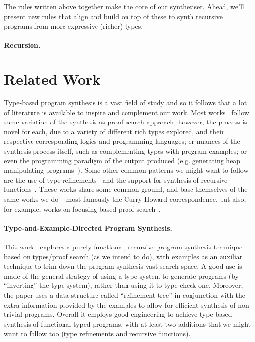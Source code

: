 \documentclass{llncs}
\newcommand{\mypara}[1]{\paragraph{\textbf{#1}.}}
\begin{document}

The rules written above together make the core of our synthetiser. Ahead, we'll
present new rules that align and build on top of these to synth recursive
programs from more expressive (richer) types.

\mypara{Recursion}

\section{Related Work}

Type-based program synthesis is a vast field of study and so it
follows that a lot of literature is available to inspire and
complement our work. Most works~\cite{DBLP:conf/lopstr/HughesO20,DBLP:conf/pldi/PolikarpovaKS16,DBLP:conf/pldi/OseraZ15,DBLP:conf/popl/FrankleOWZ16} follow some variation of the
synthesis-as-proof-search approach, however, the process is novel for
each, due to a variety of different rich types explored, and their
respective corresponding logics and programming languages; or nuances
of the synthesis process itself, such as complementing types with
program examples; or even the programming paradigm of the output
produced (e.g. generating heap manipulating
programs~\cite{DBLP:journals/pacmpl/PolikarpovaS19}).  Some other
common patterns we might want to follow are the use of type
refinements~\cite{DBLP:conf/pldi/PolikarpovaKS16} and the support for synthesis of recursive
functions~\cite{DBLP:conf/pldi/PolikarpovaKS16,DBLP:conf/pldi/OseraZ15}.  These works share some common ground, and base
themselves of the same works we do -- most famously the Curry-Howard
correspondence, but also, for example, works on focusing-based
proof-search~\cite{10.1093/logcom/2.3.297}.

\mypara{Type-and-Example-Directed Program Synthesis} This
work~\cite{DBLP:conf/pldi/OseraZ15,DBLP:conf/popl/FrankleOWZ16}
explores a purely functional, recursive program synthesis technique
based on types/proof search (as we intend to do), with examples as an
auxiliar technique to trim down the program synthesis vast search
space. A good use is
made of the general strategy of using a type system to generate
programs (by ``inverting'' the type system), rather than using it to
type-check one.  Moreover, the paper uses a data structure called
``refinement tree'' in conjunction with the extra information provided
by the examples to allow for efficient synthesis of non-trivial
programs. Overall it employs good engineering to achieve type-based
synthesis of functional typed programs, with at least two additions
that we might want to follow too (type refinements and recursive
functions).
\end{document}
